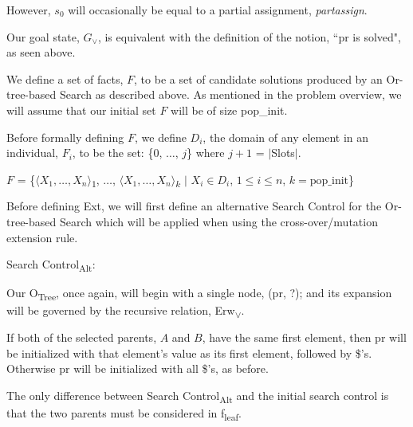 \documentclass[11pt, oneside]{article}   	%
\newenvironment{cmr}{\fontfamily{cmr}\selectfont}{\par}
\begin{document}
\noindent However, $s_0$ will occasionally be equal to a partial assignment, \textit{partassign}.

\noindent Our goal state, $G_{\lor}$, is equivalent with the definition of the notion, ``pr is solved", as seen above.\\
\newpage


\begin{cmr}
\noindent We define a set of facts, $F$, to be a set of candidate solutions produced by an Or-tree-based Search as described above.
As mentioned in the problem overview, we will assume that our initial set $F$ will be of size pop_init.
\end{cmr}

\noindent Before formally defining $F$, we define $D_i$, the domain of any element in an individual, $F_i$, to be the set: \{0, $\dots$, $j$\} where $j+1$ = $\vert$Slots$\vert$.

\noindent \centerline{$F$ = \{$\langle X_1, \dots, X_n\rangle$\textsubscript{$1$}, $\dots$, $\langle X_1, \dots, X_n\rangle$\textsubscript{$k$} $\vert$ $X_i \in D_i$, $1 \le i \le n$, $k = \text{pop_init}$\}}

\noindent Before defining Ext, we will first define an alternative Search Control for the Or-tree-based Search which will be applied when using the cross-over/mutation extension rule.

\noindent Search Control\textsubscript{Alt}:

\noindent Our O\textsubscript{Tree}, once again, will begin with a single node, (pr, ?); and its expansion will be governed by the recursive relation, Erw\textsubscript{$\lor$}.

\noindent If both of the selected parents, $A$ and $B$, have the same first element, then pr will be initialized with that element's value as its first element, followed by \$'s. Otherwise pr will be initialized with all \$'s, as before.

\noindent The only difference between Search Control\textsubscript{Alt} and the initial search control is that the two parents must be considered in f\textsubscript{leaf}.
\end{document}
